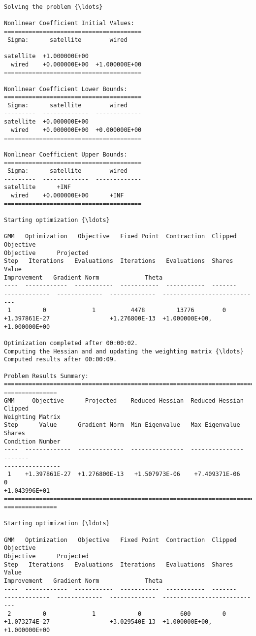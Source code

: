     \begin{Verbatim}[commandchars=\\\{\}]
Solving the problem {\ldots}

Nonlinear Coefficient Initial Values:
=======================================
 Sigma:      satellite        wired
---------  -------------  -------------
satellite  +1.000000E+00
  wired    +0.000000E+00  +1.000000E+00
=======================================

Nonlinear Coefficient Lower Bounds:
=======================================
 Sigma:      satellite        wired
---------  -------------  -------------
satellite  +0.000000E+00
  wired    +0.000000E+00  +0.000000E+00
=======================================

Nonlinear Coefficient Upper Bounds:
=======================================
 Sigma:      satellite        wired
---------  -------------  -------------
satellite      +INF
  wired    +0.000000E+00      +INF
=======================================

Starting optimization {\ldots}

GMM   Optimization   Objective   Fixed Point  Contraction  Clipped    Objective
Objective      Projected
Step   Iterations   Evaluations  Iterations   Evaluations  Shares       Value
Improvement   Gradient Norm             Theta
----  ------------  -----------  -----------  -----------  -------
-------------  -------------  -------------  ----------------------------
 1         0             1          4478         13776        0
+1.397861E-27                 +1.276800E-13  +1.000000E+00, +1.000000E+00

Optimization completed after 00:00:02.
Computing the Hessian and and updating the weighting matrix {\ldots}
Computed results after 00:00:09.

Problem Results Summary:
================================================================================
===============
GMM     Objective      Projected    Reduced Hessian  Reduced Hessian  Clipped
Weighting Matrix
Step      Value      Gradient Norm  Min Eigenvalue   Max Eigenvalue   Shares
Condition Number
----  -------------  -------------  ---------------  ---------------  -------
----------------
 1    +1.397861E-27  +1.276800E-13   +1.507973E-06    +7.409371E-06      0
+1.043996E+01
================================================================================
===============

Starting optimization {\ldots}

GMM   Optimization   Objective   Fixed Point  Contraction  Clipped    Objective
Objective      Projected
Step   Iterations   Evaluations  Iterations   Evaluations  Shares       Value
Improvement   Gradient Norm             Theta
----  ------------  -----------  -----------  -----------  -------
-------------  -------------  -------------  ----------------------------
 2         0             1            0           600         0
+1.073274E-27                 +3.029540E-13  +1.000000E+00, +1.000000E+00


\end{Verbatim}
